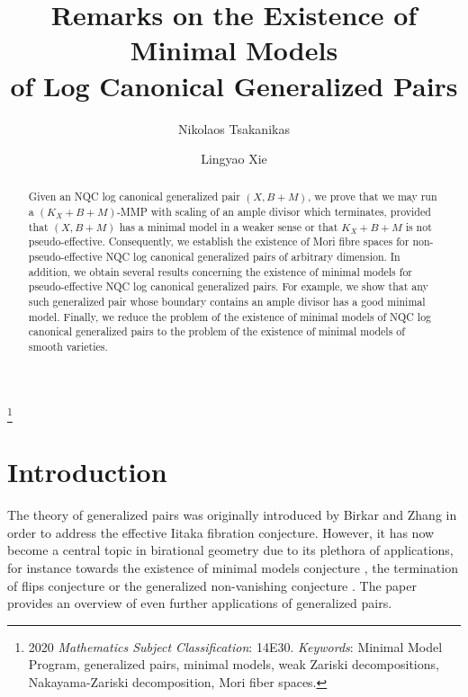	
	\title[Remarks on the Existence of Minimal Models]{Remarks on the Existence of Minimal Models \\ of Log Canonical Generalized Pairs}
	
	\author[Nikolaos Tsakanikas]{Nikolaos Tsakanikas}
	\address{Max Planck Institute for Mathematics, Vivatsgasse 7, 53111 Bonn, Germany}
	
	\author[Lingyao Xie]{Lingyao Xie}
	\address{Department of Mathematics, The University of Utah, Salt Lake City, UT 84112, USA}
	
	\thanks{2020 \emph{Mathematics Subject Classification}: 14E30. \newline
		\indent \emph{Keywords}: Minimal Model Program, generalized pairs, minimal models, weak Zariski decompositions, Nakayama-Zariski decomposition, Mori fiber spaces.
	}
	
	\begin{abstract}
		Given an NQC log canonical generalized pair $(X,B+M)$, we prove that we may run a $(K_X+B+M)$-MMP with scaling of an ample divisor which terminates, provided that $(X,B+M)$ has a minimal model in a weaker sense or that $K_X+B+M$ is not pseudo-effective. Consequently, we establish the existence of Mori fibre spaces for non-pseudo-effective NQC log canonical generalized pairs of arbitrary dimension. In addition, we obtain several results concerning the existence of minimal models for pseudo-effective NQC log canonical generalized pairs. For example, we show that any such generalized pair whose boundary contains an ample divisor has a good minimal model. Finally, we reduce the problem of the existence of minimal models of NQC log canonical generalized pairs to the problem of the existence of minimal models of smooth varieties.
	\end{abstract}
	
	\maketitle
	
	\begingroup
	\hypersetup{linkcolor=black}
	\setcounter{tocdepth}{1}
	\tableofcontents
	\endgroup
	
	
	
	
	\section{Introduction}
	
	The theory of generalized pairs was originally introduced by Birkar and Zhang \cite{BZ16} in order to address the effective Iitaka fibration conjecture. However, it has now become a central topic in birational geometry due to its plethora of applications, for instance towards the existence of minimal models conjecture \cite{LT22a,LT22b,LX22a,LX22b}, the termination of flips conjecture \cite{HM20,CT20} or the generalized non-vanishing conjecture \cite{HanLiu20,Hash22b,LMPTX22}. The paper \cite{Bir21c} provides an overview of even further applications of generalized pairs.
	
